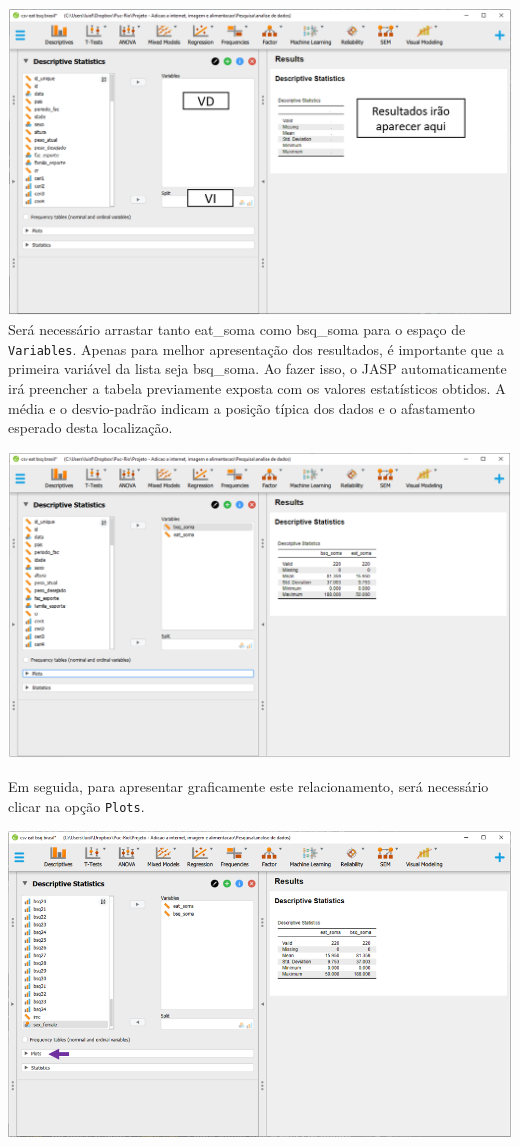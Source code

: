 \documentclass[
]{book}
\begin{document}
\includegraphics{./img/cap_correlacao_descritivo2.png}
Será necessário arrastar tanto eat\_soma como bsq\_soma para o espaço de \texttt{Variables}. Apenas para melhor apresentação dos resultados, é importante que a primeira variável da lista seja bsq\_soma. Ao fazer isso, o JASP automaticamente irá preencher a tabela previamente exposta com os valores estatísticos obtidos. A média e o desvio-padrão indicam a posição típica dos dados e o afastamento esperado desta localização.

\includegraphics{./img/cap_correlacao_descritivo3.png}

Em seguida, para apresentar graficamente este relacionamento, será necessário clicar na opção \texttt{Plots}.

\includegraphics{./img/cap_correlacao_plot.png}
\end{document}
